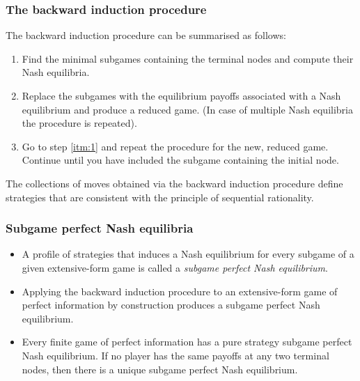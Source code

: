 \documentclass[10pt]{beamer}
\theoremstyle{definition}
\begin{document}
\begin{frame}[fragile]
\frametitle{The backward induction procedure}
The backward induction procedure can be summarised as follows:
\begin{enumerate}\itemsep1em
\item \label{itm:1} Find the minimal subgames containing the terminal nodes and compute their Nash equilibria.
\item Replace the subgames with the equilibrium payoffs associated with a Nash equilibrium and produce a reduced game. (In case of multiple Nash equilibria the procedure is repeated).
\item Go to step \ref{itm:1} and repeat the procedure for the new, reduced game. Continue until you have included the subgame containing the initial node.
\end{enumerate}\bigskip

The collections of moves obtained via the backward induction procedure define strategies that are consistent with the principle of sequential rationality.
\end{frame}



\begin{frame}[fragile]
\frametitle{Subgame perfect Nash equilibria}
\begin{itemize}\itemsep1em
\item A profile of strategies that induces a Nash equilibrium for every subgame of a given extensive-form game is called a \emph{subgame perfect Nash equilibrium}.
\item Applying the backward induction procedure to an extensive-form game of perfect information by construction produces a subgame perfect Nash equilibrium.
\item Every finite game of perfect information has a pure strategy subgame perfect Nash equilibrium. If no player has the same payoffs at any two terminal nodes, then there is a unique subgame perfect Nash equilibrium.
\end{itemize}
\end{frame}
\end{document}
